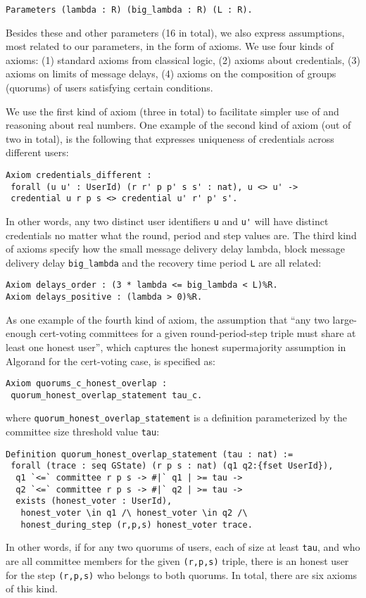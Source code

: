 \begin{lstlisting}[language=Coq]
Parameters (lambda : R) (big_lambda : R) (L : R).
\end{lstlisting}

Besides these and other parameters (16 in total), we also express assumptions, most related to our parameters, in the form of axioms. We use four kinds of axioms:
(1) standard axioms from classical logic, (2) axioms about credentials, (3) axioms on limits of message delays, (4) axioms on the composition of groups (quorums) of users satisfying certain conditions.

We use the first kind of axiom (three in total) to facilitate simpler use of and reasoning about real numbers.
One example of the second kind of axiom (out of two in total), is the following that expresses uniqueness of credentials
across different users:
\begin{lstlisting}[language=Coq]
Axiom credentials_different :
 forall (u u' : UserId) (r r' p p' s s' : nat), u <> u' ->
 credential u r p s <> credential u' r' p' s'.
\end{lstlisting}
In other words, any two distinct user identifiers \lstinline{u} and \lstinline{u'} will have distinct credentials no matter what the round, period and step values are.
The third kind of axioms specify how the small message delivery delay lambda, block message delivery delay \lstinline{big_lambda} and the recovery time period \lstinline{L} are all related:
\begin{lstlisting}[language=Coq]
Axiom delays_order : (3 * lambda <= big_lambda < L)%R.
Axiom delays_positive : (lambda > 0)%R.
\end{lstlisting}

As one example of the fourth kind of axiom, the assumption that ``any two large-enough cert-voting committees for a given round-period-step triple must share at least one honest user'', which captures the honest supermajority assumption in Algorand for the cert-voting case, is specified as:
\begin{lstlisting}[language=Coq]
Axiom quorums_c_honest_overlap :
 quorum_honest_overlap_statement tau_c.
\end{lstlisting}
where \lstinline{quorum_honest_overlap_statement} is a definition parameterized by the committee size threshold value \lstinline{tau}:
\begin{lstlisting}[language=Coq]
Definition quorum_honest_overlap_statement (tau : nat) :=
 forall (trace : seq GState) (r p s : nat) (q1 q2:{fset UserId}),
  q1 `<=` committee r p s -> #|` q1 | >= tau ->					
  q2 `<=` committee r p s -> #|` q2 | >= tau ->					
  exists (honest_voter : UserId),
   honest_voter \in q1 /\ honest_voter \in q2 /\
   honest_during_step (r,p,s) honest_voter trace.
\end{lstlisting}
In other words, if for any two quorums of users, each of size at least \lstinline{tau}, and who are all committee members for the given \lstinline{(r,p,s)} triple, there is an honest user for the step \lstinline{(r,p,s)} who belongs to both quorums. In total, there are six axioms of this kind.


